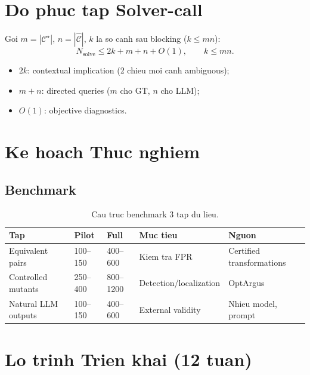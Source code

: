 \documentclass[11pt,a4paper]{article}
\begin{document}
\section{Do phuc tap Solver-call}

Goi $m=|\mathcal{C}^\star|$, $n=|\widehat{\mathcal{C}}|$, $k$ la so canh sau blocking ($k\leq mn$):
\[
N_{\mathrm{solve}} \leq 2k + m + n + O(1), \qquad k \leq mn.
\]

\begin{itemize}
  \item $2k$: contextual implication (2 chieu moi canh ambiguous);
  \item $m+n$: directed queries ($m$ cho GT, $n$ cho LLM);
  \item $O(1)$: objective diagnostics.
\end{itemize}

\section{Ke hoach Thuc nghiem}

\subsection{Benchmark}

\begin{table}[htbp]
\centering
\caption{Cau truc benchmark 3 tap du lieu.}
\small
\begin{tabularx}{\textwidth}{L{3cm} C{1.5cm} C{2cm} Y Y}
\toprule
\textbf{Tap} & \textbf{Pilot} & \textbf{Full} & \textbf{Muc tieu} & \textbf{Nguon} \\
\midrule
Equivalent pairs & 100--150 & 400--600 & Kiem tra FPR & Certified transformations \\
Controlled mutants & 250--400 & 800--1200 & Detection/localization & OptArgus \\
Natural LLM outputs & 100--150 & 400--600 & External validity & Nhieu model, prompt \\
\bottomrule
\end{tabularx}
\end{table}

\section{Lo trinh Trien khai (12 tuan)}
\end{document}
